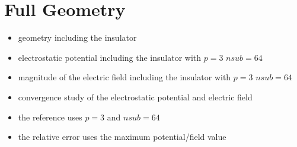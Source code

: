 \section{Full Geometry}
\begin{itemize}
  \item geometry including the insulator
\end{itemize}

\begin{center}
\begin{figure}[ht]
  
\end{figure}
\end{center}

\begin{itemize}
  \item electrostatic potential including the insulator with $p=3$ $nsub=64$
\end{itemize}

\begin{center}
\begin{figure}
  
\end{figure}
\end{center}

\begin{itemize}
  \item magnitude of the electric field including the insulator with $p=3$ $nsub=64$
\end{itemize}

\begin{center}
\begin{figure}
  
\end{figure}
\end{center}

\begin{itemize}
  \item convergence study of the electrostatic potential and electric field
  \item the reference uses $p=3$ and $nsub=64$
  \item the relative error uses the maximum potential/field value
\end{itemize}

\begin{figure}
  \hspace{-2.5cm}
  
\end{figure}
\newpage
